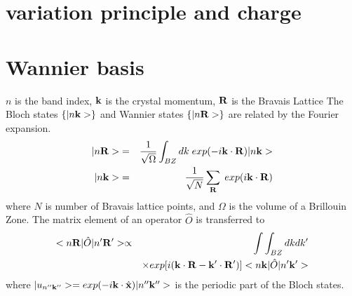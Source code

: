\documentclass[aps,prb,preprint]{revtex4-1}
\begin{document}
\begin{appendix}
\section{variation principle and charge}

\section{Wannier basis}
$n$ is the band index, $\bf k$ is the crystal momentum, ${\bf R} $ is the Bravais Lattice
The Bloch states $\{ |n{\bf k}> \}$ and Wannier states $\{ |n{\bf R}> \}$ are related by the Fourier expansion. 
\begin{eqnarray}
|n{\bf R}>&=&\frac{1}{\sqrt{\Omega}} \int_{BZ} dk \; exp(-i{\bf k} \cdot {\bf R})|n{\bf k}>\\
|n{\bf k}>&=&\frac{1}{\sqrt{N}} \sum_{\bf R} \; exp(i{\bf k} \cdot {\bf R}) 
\end{eqnarray} 
where $N$ is number of Bravais lattice points, and $\Omega$ is the volume of a Brillouin Zone. 
The matrix element of an operator $\hat{O}$ is transferred to 
\begin{eqnarray}
 < n{\bf R}| \hat{O} |n'{\bf R'}> \propto && \int \int_{BZ} dk dk'  \\
&& \times  exp[i ({\bf k} \cdot {\bf R}- {\bf k'} \cdot {\bf R'} ) ]< n{\bf k}| \hat{O} |n'{\bf k'}>  \nonumber 
\end{eqnarray} 
where $|u_{n''{\bf k''}}> = exp(-i{\bf k} \cdot \hat{\bf x}) |n''{\bf k''}>$ is the periodic part of the Bloch states.


\end{appendix}
\end{document}
